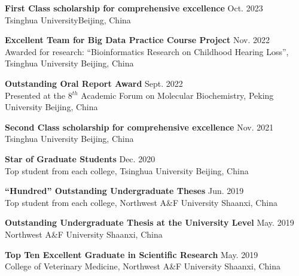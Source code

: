\textbf{First Class scholarship for comprehensive excellence} \hfill Oct. 2023 \\
{\small Tsinghua University\hfill  Beijing, China}

\vspace{4pt}

\textbf{Excellent Team for Big Data Practice Course Project} \hfill Nov. 2022 \\
{\small Awarded for research: ``Bioinformatics Research on Childhood Hearing Loss'', Tsinghua University \hfill Beijing, China}

\vspace{4pt}

\textbf{Outstanding Oral Report Award} \hfill Sept. 2022 \\
{\small Presented at the 8$^{th}$ Academic Forum on Molecular Biochemistry, Peking University \hfill Beijing, China}

\vspace{4pt}

\textbf{Second Class scholarship for comprehensive excellence} \hfill Nov. 2021 \\
{\small Tsinghua University \hfill Beijing, China}

\vspace{4pt}

\textbf{Star of Graduate Students} \hfill Dec. 2020 \\
{\small Top student from each college, Tsinghua University \hfill Beijing, China}

\vspace{4pt}

\textbf{``Hundred'' Outstanding Undergraduate Theses} \hfill Jun. 2019 \\
{\small Top student from each college, Northwest A\&F University \hfill Shaanxi, China}

\vspace{4pt}

\textbf{Outstanding Undergraduate Thesis at the University Level} \hfill May. 2019 \\
{\small Northwest A\&F University \hfill Shaanxi, China}

\vspace{4pt}

\textbf{Top Ten Excellent Graduate in Scientific Research} \hfill May. 2019 \\
{\small College of Veterinary Medicine, Northwest A\&F University \hfill Shaanxi, China}

\vspace{4pt}

